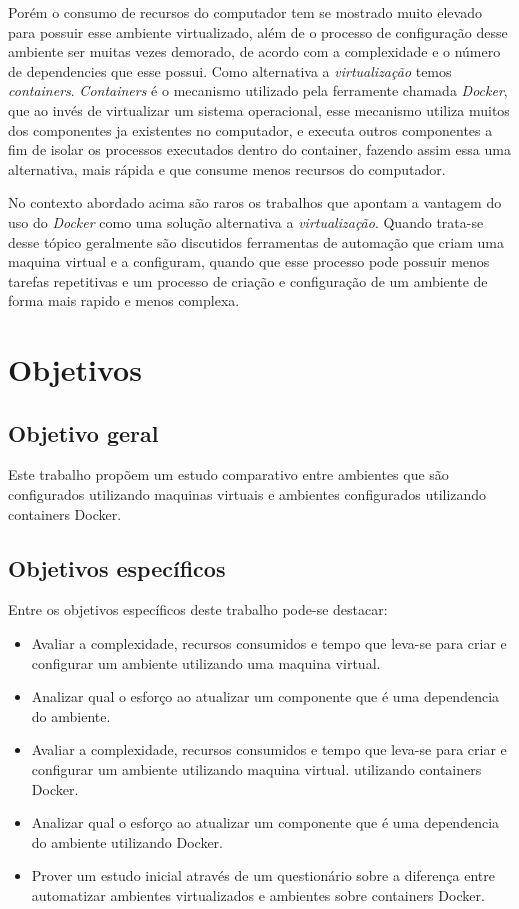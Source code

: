 \documentclass[11pt,a4paper]{article}
\begin{document}
Porém o consumo de recursos do computador tem se mostrado muito elevado para possuir esse ambiente virtualizado,
além de o processo de configuração desse ambiente ser muitas vezes demorado, de acordo com a complexidade e
o número de dependencies que esse possui. Como alternativa a \textit{virtualização} temos \textit{containers}.
\textit{Containers} é o mecanismo utilizado pela ferramente chamada \textit{Docker}, que ao invés de virtualizar
um sistema operacional, esse mecanismo utiliza muitos dos componentes ja existentes no computador, e executa
outros componentes a fim de isolar os processos executados dentro do container\cite{TW_docker_for_builds}, fazendo assim essa uma alternativa,
mais rápida e que consume menos recursos do computador.

No contexto abordado acima são raros os trabalhos que apontam a vantagem do uso do \textit{Docker} como uma solução
alternativa a \textit{virtualização}\cite{Jafari_infra_as_a_code}. Quando trata-se desse tópico geralmente são discutidos ferramentas de automação
que criam uma maquina virtual e a configuram, quando que esse processo pode possuir menos tarefas repetitivas e um
processo de criação e configuração de um ambiente de forma mais rapido e menos complexa.

\section{Objetivos}\label{sec:objetivos}

\subsection{Objetivo geral}

Este trabalho propõem um estudo comparativo entre ambientes que são configurados utilizando maquinas virtuais e ambientes
configurados utilizando containers Docker.

\subsection{Objetivos específicos}

Entre os objetivos específicos deste trabalho pode-se destacar:

\begin{itemize}
  \item Avaliar a complexidade, recursos consumidos e tempo que leva-se para criar e configurar um ambiente
    utilizando uma maquina virtual.
  \item Analizar qual o esforço ao atualizar um componente que é uma dependencia do ambiente.
  \item Avaliar a complexidade, recursos consumidos e tempo que leva-se para criar e configurar um ambiente
    utilizando maquina virtual.
    utilizando containers Docker.
  \item Analizar qual o esforço ao atualizar um componente que é uma dependencia do ambiente utilizando Docker.
  \item Prover um estudo inicial através de um questionário sobre a diferença entre automatizar
    ambientes virtualizados e ambientes sobre containers Docker.
\end{itemize}
\end{document}
